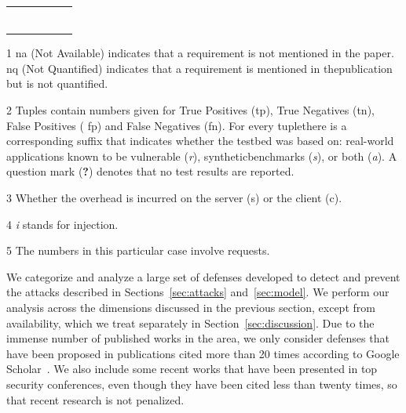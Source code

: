 \documentclass[conference]{IEEEtran}
\makeatletter
\newcommand{\thickhline}{%
    \noalign {\ifnum 0=`}\fi \hrule height 1pt
    \futurelet \reserved@a \@xhline
}
\makeatother
\begin{document}
\begin{table}[t]
\begin{threeparttable}
\begin{small}
{\begin{tabular}{l|c|c|cc|c}
  \thickhline
    \end{tabular}}
    \begin{tablenotes}
  \begin{footnotesize}
        \item[1] {\sc na} (Not Available) indicates that a requirement is not mentioned in the paper.
  {\sc nq} (Not Quantified) indicates that a requirement is mentioned in the\newline publication
  but is not quantified.
      \item[2] Tuples contain numbers given for True Positives
        ({\sc tp}), True Negatives ({\sc tn}), False Positives ({\sc
          fp}) and False Negatives ({\sc fn}). For every tuple\newline there is a corresponding suffix that indicates whether the testbed was
  based on: real-world applications known to be vulnerable ({\it r}),
  synthetic\newline benchmarks ({\it s}), or both ({\it a}).
  A question mark ({\bf ?}) denotes that no test results are reported.
    \item[3] Whether the overhead is incurred on the server ({\sc s}) or the client ({\sc c}). 
    \item[4] {\it i} stands for injection.
    \item[5] The numbers in this particular case involve requests.
  \end{footnotesize}
    \end{tablenotes}
    \end{small}
    \end{threeparttable}
\end{table}


We categorize and analyze a large set of defenses developed to detect
and prevent
the attacks described in Sections~\ref{sec:attacks} and~\ref{sec:model}.
We perform our analysis across
the dimensions discussed in the previous section,
except from availability, which we treat
separately in Section~\ref{sec:discussion}.
Due to the immense number of published works in the area, we only consider
defenses that have been proposed in publications cited more than
20 times according to Google Scholar~\cite{googleScholar}.
We also include some recent works that have been
presented in top security conferences, even though they have been
cited less than twenty times, so that recent research is not penalized.
\end{document}
